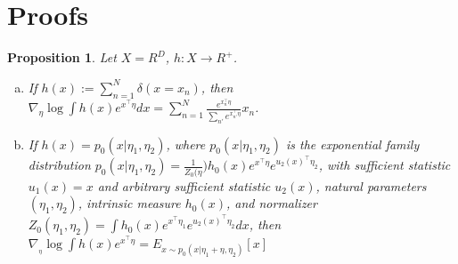 \documentclass{article}
\newtheorem{proposition}{Proposition}
\begin{document}
\section{Proofs}
\label{proofs}

\begin{proposition}
  Let $X = R^D$, $h: X \rightarrow R^{+}$. 
  \begin{enumerate}[(a)]
    \item If $h(x) := \sum_{n=1}^N \delta( x = x_n)$, then 
    $
      \nabla_\eta \log \int h(x) e^{ x^\intercal \eta } dx 
      = \sum_{n=1}^N \frac{ e^{ x_n^\intercal \eta } }{ \sum_{n'} e^{ x_{n'}^\intercal \eta } } x_n 
    $.
    \item If $h(x) = p_0( x \vert \eta_1, \eta_2)$, where $p_0(x \vert \eta_1,\eta_2)$ is the exponential family distribution $p_0(x \vert \eta_1,\eta_2) = \frac{1}{Z_0(\eta}) h_0(x) e^{x^\intercal \eta} e^{u_2(x)^\intercal \eta_2}$, with sufficient statistic $u_1(x) = x$ and arbitrary sufficient statistic $u_2(x)$, natural parameters $(\eta_1,\eta_2)$, intrinsic measure $h_0(x)$, and normalizer $Z_0(\eta_1,\eta_2) = \int h_0(x) e^{ x^\intercal \eta_1 } e^{ u_2(x)^\intercal \eta_2 } dx$, then $\nabla_{_\eta} \log \int h(x) e^{ x^\intercal \eta} = E_{x \sim p_0(x \vert \eta_1 + \eta, \eta_2)} \left[ x \right]$
  \end{enumerate}
  \label{exponential family gradient updates}
\end{proposition}
\end{document}
